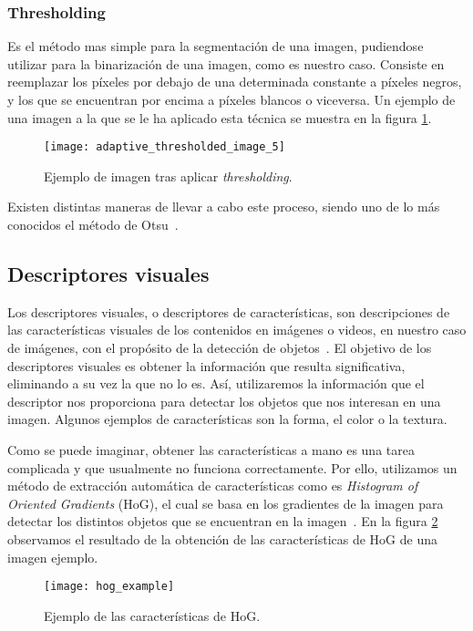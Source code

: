 \subsubsection{Thresholding}

Es el método mas simple para la segmentación de una imagen, pudiendose utilizar para la binarización de una imagen, como es nuestro caso. Consiste en reemplazar los píxeles por debajo de una determinada constante a píxeles negros, y los que se encuentran por encima a píxeles blancos o viceversa. Un ejemplo de una imagen a la que se le ha aplicado esta técnica se muestra en la figura \ref{fig:3.2.1}.

\begin{figure}
\centering
\texttt{[image: adaptive\_thresholded\_image\_5]}
\caption{Ejemplo de imagen tras aplicar \textit{thresholding}.}
\label{fig:3.2.1}
\end{figure}

Existen distintas maneras de llevar a cabo este proceso, siendo uno de lo más conocidos el método de Otsu~\cite{wiki:otsu}.

\subsection{Descriptores visuales}

Los descriptores visuales, o descriptores de características, son descripciones de las características visuales de los contenidos en imágenes o videos, en nuestro caso de imágenes, con el propósito de la detección de objetos~\cite{wiki:visualdescriptor}. El objetivo de los descriptores visuales es obtener la información que resulta significativa, eliminando a su vez la que no lo es. Así, utilizaremos la información que el descriptor nos proporciona para detectar los objetos que nos interesan en una imagen. Algunos ejemplos de características son la forma, el color o la textura.

Como se puede imaginar, obtener las características a mano es una tarea complicada y que usualmente no funciona correctamente. Por ello, utilizamos un método de extracción automática de características como es \textit{Histogram of Oriented Gradients} (HoG), el cual se basa en los gradientes de la imagen para detectar los distintos objetos que se encuentran en la imagen~\cite{wiki:hog}. En la figura \ref{fig:3.4.2} observamos el resultado de la obtención de las características de HoG de una imagen ejemplo.

\begin{figure}
\centering
\texttt{[image: hog\_example]}
\caption{Ejemplo de las características de HoG.}
\label{fig:3.4.2}
\end{figure}


